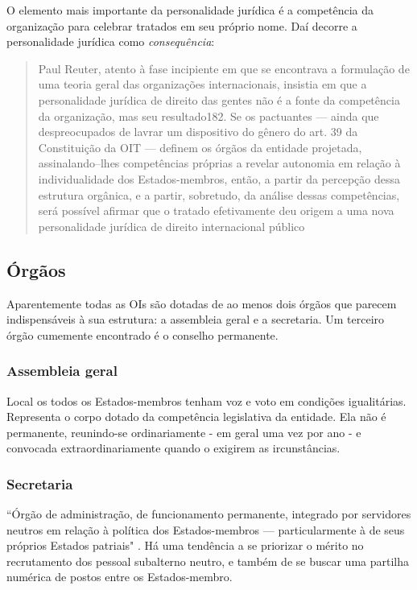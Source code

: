 \documentclass{article}
\begin{document}
O elemento mais importante da personalidade jurídica é a competência da organização para celebrar tratados em seu próprio nome. Daí decorre a personalidade jurídica como \textit{consequência}:

\begin{quote}
    Paul Reuter, atento à fase incipiente em que se encontrava a formulação de uma teoria geral das organizações internacionais, insistia em que a personalidade jurídica de direito das gentes não é a fonte da competência da organização, mas seu resultado182. Se os pactuantes — ainda que despreocupados de lavrar um dispositivo do gênero do art. 39 da Constituição da OIT — definem os órgãos da entidade projetada, assinalando--lhes competências próprias a revelar autonomia em relação à individualidade dos Estados-membros, então, a partir da percepção dessa estrutura orgânica, e a partir, sobretudo, da análise dessas competências, será possível afirmar que o tratado efetivamente deu origem a uma nova personalidade jurídica de direito internacional público \cite[p. 107]{rezek_direito_2024}
\end{quote}

\subsection{Órgãos}

Aparentemente todas as OIs são dotadas de ao menos dois órgãos que parecem indispensáveis à sua estrutura: a assembleia geral e a secretaria. Um terceiro órgão cumemente encontrado é o conselho permanente.

\subsubsection{Assembleia geral}

Local os todos os Estados-membros tenham voz e voto em condições igualitárias. Representa o corpo dotado da competência legislativa da entidade. Ela não é permanente, reunindo-se ordinariamente - em geral uma vez por ano - e convocada extraordinariamente quando o exigirem as ircunstâncias.

\subsubsection{Secretaria}

``Órgão de administração, de funcionamento permanente, integrado por servidores neutros em relação à política dos Estados-membros — particularmente à de seus próprios Estados patriais" \cite[p. 107]{rezek_direito_2024}. Há uma tendência a se priorizar o mérito no recrutamento dos pessoal subalterno neutro, e também de se buscar uma partilha numérica de postos entre os Estados-membro.
\end{document}
